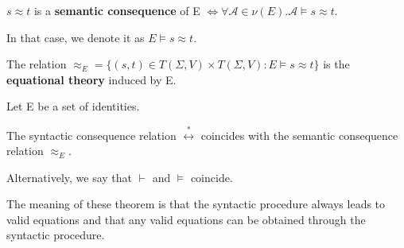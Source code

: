 \begin{definition}
$s \approx t$ is a \textbf{semantic consequence} of E $\iff \forall \mathcal{A} \in \nu(E).\mathcal{A} \models s \approx t$.

In that case, we denote it as $E \models s \approx t$.

The relation $\approx_E = \{(s,t) \in T(\Sigma,V) \times T(\Sigma,V):E \models s \approx t\}$ is the \textbf{equational theory} induced by E. 
\end{definition}

\begin{theorem}
Let E be a set of identities. 

The syntactic consequence relation $\stackrel{*}{\leftrightarrow}$ coincides with the semantic consequence relation $\approx_E$. 

Alternatively, we say that $\vdash$ and $\models$ coincide. 
\end{theorem}

The meaning of these theorem is that the syntactic procedure always leads to valid equations and that any valid equations can be obtained through the syntactic procedure. 



